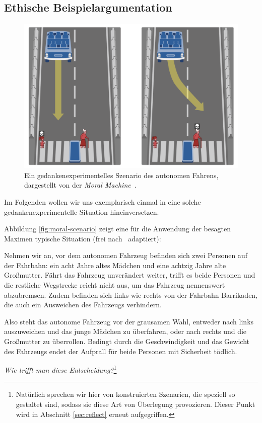 \documentclass[twocolumn, german]{tum-article}
\begin{document}
\subsection{Ethische Beispielargumentation}
\begin{figure}
	\includegraphics[width=\linewidth]{media/moral-scenario}
	\caption{Ein gedankenexperimentelles Szenario des autonomen Fahrens, dargestellt von der \emph{Moral Machine}~\cite{moral-machine-web}.}
	\label{fig:moral-scenario}
\end{figure}

Im Folgenden wollen wir uns exemplarisch einmal in eine solche gedankenexperimentelle Situation hineinversetzen.

Abbildung \vref{fig:moral-scenario} zeigt eine für die Anwendung der besagten Maximen typische Situation (frei nach~\cite[S. 69f.]{maurer-autonomous} adaptiert):

Nehmen wir an, vor dem autonomen Fahrzeug befinden sich zwei Personen auf der Fahrbahn: ein acht Jahre altes Mädchen und eine achtzig Jahre alte Großmutter.
Fährt das Fahrzeug unverändert weiter, trifft es beide Personen und die restliche Wegstrecke reicht nicht aus, um das Fahrzeug nennenswert abzubremsen.
Zudem befinden sich links wie rechts von der Fahrbahn Barrikaden, die auch ein Ausweichen des Fahrzeugs verhindern.

Also steht das autonome Fahrzeug vor der grausamen Wahl, entweder nach links auszuweichen und das junge Mädchen zu überfahren, oder nach rechts und die Großmutter zu überrollen.
Bedingt durch die Geschwindigkeit und das Gewicht des Fahrzeugs endet der Aufprall für beide Personen mit Sicherheit tödlich.

\emph{Wie trifft man diese Entscheidung?}\footnote{Natürlich sprechen wir hier von konstruierten Szenarien, die speziell so gestaltet sind, sodass sie diese Art von Überlegung provozieren. Dieser Punkt wird in Abschnitt \vref{sec:reflect} erneut aufgegriffen.}
\end{document}
